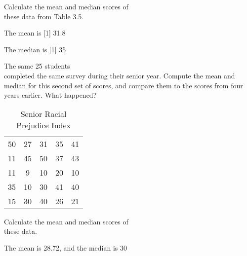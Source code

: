 \documentclass[11pt]{book}\usepackage[]{graphicx}\usepackage[]{color}
\begin{document}
\begin{exercises}
\begin{exercise}
  Calculate the mean and median scores of \\ these data from Table 3.5.

	\vspace{2mm}
	\end{exercise}
	\begin{solution}   %

	The mean is
[1] 31.8


	The median is
[1] 35


	\end{solution}

	  \begin{exercise} %

The same 25 students \\ completed the same survey during their senior  year.  Compute the mean and median for this second set of scores, and compare them to the scores from four years earlier.   What happened?

\begin{table}[htbp]
   \centering
   {\small{
   \caption{Senior Racial Prejudice Index}
   \begin{tabular}{@{} ccccc  @{}} \hline %
   50 & 27 & 31 & 35 & 41 \\
   11 & 45 & 50 & 37 & 43 \\
   11 & 9  & 10 & 20 & 10 \\
   35 & 10 & 30 & 41 & 40 \\
   15 & 30 & 40 & 26 & 21 \\ \hline
   \end{tabular}
   }}

   \label{tab:t3_6a}
\end{table}

  Calculate the mean and median scores of \\ these data.

	\vspace{2mm}
	\end{exercise}
	\vspace{2mm}
	\begin{solution}   %



  The mean is 28.72, and the median is 30

	\end{solution}


\end{exercises}
\end{document}
